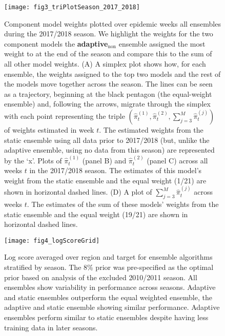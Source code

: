 \documentclass[sagev,times,Review,10pt]{sagej}
\def\adaptNon{\textbf{adaptive$_{\text{non}}$ }}
\begin{document}
\graphicspath{{../../../_6_TLGs/_G/fig3_triPlot/}}
\begin{figure}[ht!]
    \centering
    \texttt{[image: fig3\_triPlotSeason\_2017\_2018]}
    \caption{
    Component model weights plotted over epidemic weeks all ensembles during the 2017/2018 season. 
    We highlight the weights for the two component models the \adaptNon ensemble assigned the most weight to at the end of the season and compare this to the sum of all other model weights. 
    (A) A simplex plot shows how, for each
    ensemble, the weights assigned to the top two models and the rest of the models move together across the season. 
    The lines can be seen as a trajectory, beginning at the black pentagon (the equal-weight ensemble) and, following the arrows, migrate through the simplex with each point representing the triple $(\hat\pi_t^{(1)}, \hat\pi_t^{(2)}, \sum_{j=3}^M\hat\pi_t^{(j)})$ of weights estimated in week $t$. The estimated weights from the static ensemble using all data prior to 2017/2018 (but, unlike the adaptive ensemble, using no data from this season) are represented by the `x'.
    Plots of $\hat\pi_t^{(1)}$ (panel B) and $\hat\pi_t^{(2)}$ (panel C) across all weeks $t$ in the 2017/2018 season. The estimates of this model's weight from the static ensemble and the equal weight (1/21) are shown in horizontal dashed lines.
    (D) A plot of $\sum_{j=3}^M\hat\pi_t^{(j)}$ across weeks $t$. The estimates of the sum of these models' weights from the static ensemble and the equal weight (19/21) are shown in horizontal dashed lines.
     \label{fig3.dorito}}
\end{figure}

\graphicspath{{../../../_6_TLGs/_G/fig4_logScoreGrid/}}
\begin{figure}[ht!]
  \centering
  \texttt{[image: fig4\_logScoreGrid]}
  \caption{
    Log score averaged over region and target for ensemble algorithms stratified by season.
    The 8\% prior was pre-specified as the optimal prior based on analysis of the excluded 2010/2011 season.
    All ensembles show variability in performance across seasons. 
    Adaptive and static ensembles outperform the equal weighted ensemble, the adaptive and static ensemble showing similar performance.
    Adaptive ensembles perform similar to static ensembles despite having less training data in later seasons.
   \label{fig4.logScoresGrid}}
\end{figure}
\end{document}
